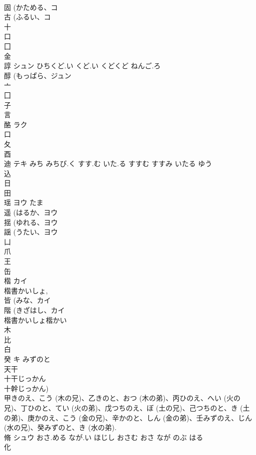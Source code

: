 \documentclass[8pt]{extreport}
\begin{document}
\begin{CJK}{UTF8}{min}
\\	固 (かためる、コ 
\\	古 (ふるい、コ 
\\	十 
\\	口 
\\	囗 
\\	金 
\\	諄	シュン	ひちくど.い くど.い くどくど ねんご.ろ	
\\	醇 (もっぱら、ジュン 
\\	亠 
\\	囗 
\\	子 
\\	言 
\\	酪	ラク		
\\	口 
\\	夂 
\\	酉 
\\	迪	テキ	みち みちび.く すす.む いた.る すすむ すすみ いたる ゆう	
\\	込 
\\	日 
\\	田 
\\	瑶	ヨウ	たま	
\\	遥 (はるか、ヨウ 
\\	揺 (ゆれる、ヨウ 
\\	謡 (うたい、ヨウ 
\\	凵 
\\	爪 
\\	王 
\\	缶 
\\	楷	カイ		
\\	楷書かいしょ, 
\\	皆 (みな、カイ 
\\	階 (きざはし、カイ 
\\	楷書かいしょ楷かい
\\	木 
\\	比 
\\	白 
\\	癸	キ	みずのと	
\\	天干 
\\	十干じっかん 
\\	十幹じっかん) 
\\	甲きのえ、こう (木の兄)、乙きのと、おつ (木の弟)、丙ひのえ、へい (火の兄)、丁ひのと、てい (火の弟)、戊つちのえ、ぼ (土の兄)、己つちのと、き (土の弟)、庚かのえ、こう (金の兄)、辛かのと、しん (金の弟)、壬みずのえ、じん (水の兄)、癸みずのと、き (水の弟). 
\\	脩	シュウ	おさ.める なが.い ほじし おさむ おさ なが のぶ はる	
\\	化 

\end{CJK}
\end{document}
